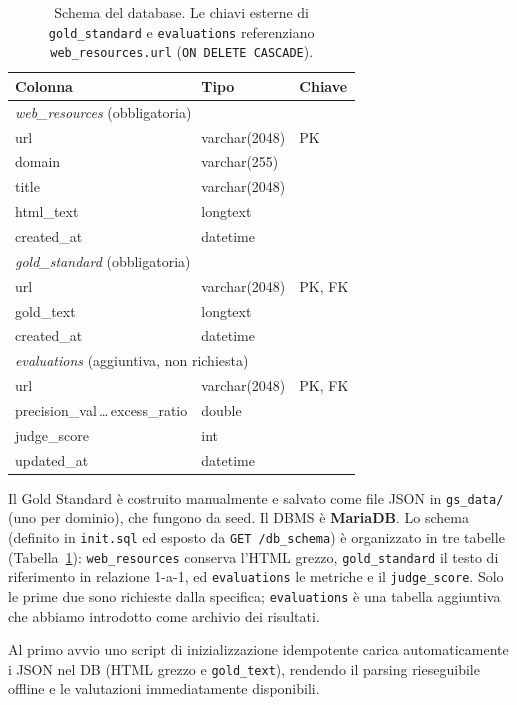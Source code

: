 \documentclass[11pt]{article}
\begin{document}
\begin{table}[h]
\centering
\small
\begin{tabular}{lll}
\toprule
\textbf{Colonna} & \textbf{Tipo} & \textbf{Chiave}\\
\midrule
\multicolumn{3}{l}{\emph{web\_resources} (obbligatoria)}\\
\quad url         & varchar(2048) & PK \\
\quad domain      & varchar(255)  & \\
\quad title       & varchar(2048) & \\
\quad html\_text  & longtext      & \\
\quad created\_at & datetime      & \\
\midrule
\multicolumn{3}{l}{\emph{gold\_standard} (obbligatoria)}\\
\quad url         & varchar(2048) & PK, FK \\
\quad gold\_text  & longtext      & \\
\quad created\_at & datetime      & \\
\midrule
\multicolumn{3}{l}{\emph{evaluations} (aggiuntiva, non richiesta)}\\
\quad url                 & varchar(2048) & PK, FK \\
\quad precision\_val\,\ldots\,excess\_ratio & double & \\
\quad judge\_score        & int           & \\
\quad updated\_at         & datetime      & \\
\bottomrule
\end{tabular}
\caption{Schema del database. Le chiavi esterne di \texttt{gold\_standard} e \texttt{evaluations} referenziano \texttt{web\_resources.url} (\texttt{ON DELETE CASCADE}).}
\label{tab:schema}
\end{table}

Il Gold Standard è costruito manualmente e salvato come file JSON in \texttt{gs\_data/} (uno per dominio), che fungono da seed. Il DBMS è \textbf{MariaDB}. Lo schema (definito in \texttt{init.sql} ed esposto da \texttt{GET /db\_schema}) è organizzato in tre tabelle (Tabella~\ref{tab:schema}): \texttt{web\_resources} conserva l'HTML grezzo, \texttt{gold\_standard} il testo di riferimento in relazione 1-a-1, ed \texttt{evaluations} le metriche e il \texttt{judge\_score}. Solo le prime due sono richieste dalla specifica; \texttt{evaluations} è una tabella aggiuntiva che abbiamo introdotto come archivio dei risultati.

Al primo avvio uno script di inizializzazione idempotente carica automaticamente i JSON nel DB (HTML grezzo e \texttt{gold\_text}), rendendo il parsing rieseguibile offline e le valutazioni immediatamente disponibili.
\end{document}
